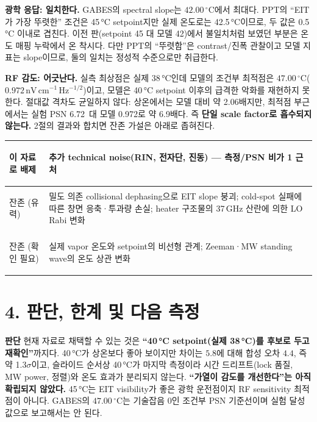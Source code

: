 \documentclass[10pt,a4paper]{article}
\newcommand{\sensunit}{\mathrm{nV\,cm^{-1}\,Hz^{-1/2}}}
\newcommand{\summarybox}[1]{%
  \noindent\colorbox{pale}{%
    \parbox{\dimexpr\textwidth-2\fboxsep\relax}{#1}}}
\providecommand{\SlopeOptimumTemperatureC}{42.00}
\providecommand{\SensitivityOptimumTemperatureC}{47.00}
\providecommand{\TotalSensitivityOptimum}{0.972}
\providecommand{\ModelToPPTScaleRoom}{2.06}
\providecommand{\PPTBestPSNLimit}{6.72}
\providecommand{\ModelToPPTScaleOptimum}{6.9}
\begin{document}
\textbf{광학 응답: 일치한다.} GABES의 spectral slope는 \(\SlopeOptimumTemperatureC\,^\circ\mathrm{C}\)에서
최대다. PPT의 ``EIT가 가장 뚜렷한'' 조건은 45\,°C setpoint지만 실제 온도로는 42.5\,°C이므로,
두 값은 0.5\,°C 이내로 겹친다. 이전 판(setpoint 45 대 모델 42)에서 불일치처럼 보였던 부분은
온도 매핑 누락에서 온 착시다. 다만 PPT의 ``뚜렷함''은 contrast/진폭 관찰이고 모델 지표는 slope이므로,
둘의 일치는 정성적 수준으로만 취급한다.

\textbf{RF 감도: 어긋난다.} 실측 최상점은 실제 38\,°C인데 모델의 조건부 최적점은
\(\SensitivityOptimumTemperatureC\,^\circ\mathrm{C}\)(\(\TotalSensitivityOptimum\,\sensunit\))이고,
모델은 40\,°C setpoint 이후의 급격한 악화를 재현하지 못한다. 절대값 격차도 균일하지 않다:
상온에서는 모델 대비 약 \ModelToPPTScaleRoom 배지만, 최적점 부근에서는 실험 PSN \PPTBestPSNLimit\ 대 모델
\TotalSensitivityOptimum 로 약 \ModelToPPTScaleOptimum 배다. 즉 \textbf{단일 scale factor로 흡수되지 않는다.} 2절의 결과와 합치면 잔존 가설은
아래로 좁혀진다.

\begin{tabularx}{\textwidth}{>{\bfseries\raggedright\arraybackslash}p{3.9cm}X}
\toprule
이 자료로 배제 & 추가 technical noise(RIN, 전자단, 진동) --- 측정/PSN 비가 1 근처\\
\midrule
잔존 (유력) & 밀도 의존 collisional dephasing으로 EIT slope 붕괴; cold-spot 실패에 따른
창면 응축·투과량 손실; heater 구조물의 37\,GHz 산란에 의한 LO Rabi 변화\\
잔존 (확인 필요) & 실제 vapor 온도와 setpoint의 비선형 관계; Zeeman·MW standing wave의 온도 상관 변화\\
\bottomrule
\end{tabularx}

\section*{4. 판단, 한계 및 다음 측정}

\summarybox{%
\textbf{\color{navy}판단}\quad
현재 자료로 채택할 수 있는 것은 \textbf{``40\,°C setpoint(실제 38\,°C)를 후보로 두고 재확인''}까지다.
40\,°C가 상온보다 좋아 보이지만 차이는 \(5.8\)에 대해 합성 오차 \(4.4\), 즉 약 1.3$\sigma$이고,
슬라이드 순서상 40\,°C가 마지막 측정이라 시간 드리프트(lock 품질, MW power, 정렬)와 온도 효과가
분리되지 않는다. \textbf{``가열이 감도를 개선한다''는 아직 확립되지 않았다.}
45\,°C는 EIT visibility가 좋은 광학 운전점이지 RF sensitivity 최적점이 아니다.
GABES의 \(\SensitivityOptimumTemperatureC\,^\circ\mathrm{C}\)는 기술잡음 0인 조건부 PSN 기준선이며
실험 달성값으로 보고해서는 안 된다.}
\end{document}
